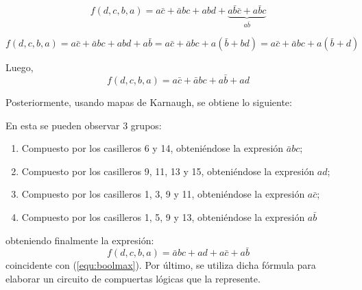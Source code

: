 \documentclass[a4paper]{article}
\begin{document}
\begin{center}
\[
	f \left( d,c,b,a \right) = a\bar{c} + \bar{a}bc + abd + \underbrace{a\bar{b}\bar{c} + a\bar{b}c}_{a\bar{b}}
\]

\[
	f \left( d,c,b,a \right) = a\bar{c} + \bar{a}bc + abd + a\bar{b} = a\bar{c} + \bar{a}bc + a \left( \bar{b} + bd \right) = a\bar{c} + \bar{a}bc + a \left( \bar{b} + d \right)
\]

Luego,
\begin{equation}
f \left( d,c,b,a \right) = a\bar{c} + \bar{a}bc + a\bar{b} + ad
	\label{equ:boolmax}
\end{equation}

Posteriormente, usando mapas de Karnaugh, se obtiene lo siguiente:

\end{center}


En esta se pueden observar 3 grupos:
\begin{enumerate}
	\item Compuesto por los casilleros 6 y 14, obteniéndose la expresión $ \bar{a} b c $;
	\item Compuesto por los casilleros 9, 11, 13 y 15, obteniéndose la expresión $ a d $;
	\item Compuesto por los casilleros 1, 3, 9 y 11, obteniéndose la expresión $ a \bar{c}$;
	\item Compuesto por los casilleros 1, 5, 9 y 13, obteniéndose la expresión $ a \bar{b} $
\end{enumerate}
obteniendo finalmente la expresión: 
\begin{equation}
	f \left( d,c,b,a \right) = \bar{a} b c + a d + a \bar{c} + a \bar{b}
	\label{equ:k2}
\end{equation}
coincidente con (\ref{equ:boolmax}). Por último, se utiliza dicha fórmula para elaborar un circuito de compuertas lógicas que la represente.
\end{document}
